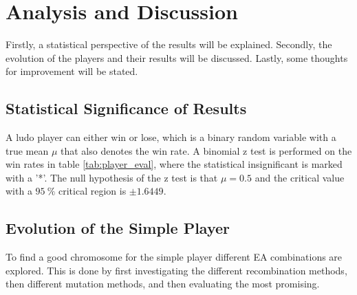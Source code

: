 \documentclass{llncs}
\begin{document}
\begin{table}[]
\centering
{}
\caption{Win rate \% of two players vs. two opponents for $2500$ games. *Results that are statistical insignificant with a confidence level of $95\ \%$.}
\label{tab:player_eval}
\end{table}

\section{Analysis and Discussion} \label{sec:discussion}
Firstly, a statistical perspective of the results will be explained. Secondly, the evolution of the players and their results will be discussed. Lastly, some thoughts for improvement will be stated.

\subsection{Statistical Significance of Results}
A ludo player can either win or lose, which is a binary random variable with a true mean $\mu$ that also denotes the win rate. A binomial z test \cite{z_test} is performed on the win rates in table \ref{tab:player_eval}, where the statistical insignificant is marked with a '*'. The null hypothesis of the z test is that $\mu = 0.5$ and the critical value with a $95\ \%$ critical region is $\pm 1.6449$. 

\subsection{Evolution of the Simple Player}
To find a good chromosome for the simple player different EA combinations are explored. This is done by first investigating the different recombination methods, then different mutation methods, and then evaluating the most promising.
\end{document}
